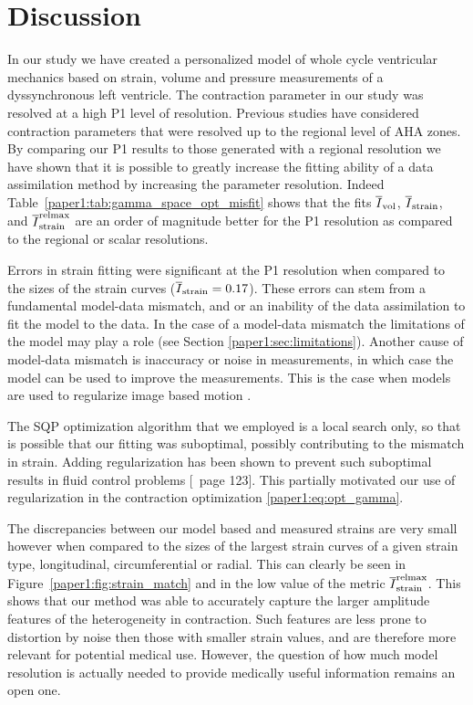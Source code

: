 \section{Discussion}
\label{paper1:sec:discussion}
In our study we have created a personalized model of whole cycle ventricular mechanics
based on strain, volume and pressure measurements of a dyssynchronous left ventricle. 
The contraction parameter in our study was resolved at a high P1 level of resolution.
Previous studies \cite{wong2015velocity, chabiniok2012estimation} have considered
contraction parameters that were resolved up to the regional level of AHA zones. By comparing
our P1 results to those generated with a regional resolution we have shown that it is possible
to greatly increase the fitting ability of a data assimilation method by increasing the 
parameter resolution. Indeed Table~\ref{paper1:tab:gamma_space_opt_misfit} shows 
that the fits $\overline{I}_{\text{vol}}$, $\overline{I}_{\text{strain}}$, and  $\overline{I}^{\text{relmax}}_{\text{strain}}$ are an order of magnitude better for
the P1 resolution as compared to the regional or scalar resolutions. 

Errors in strain fitting were significant at the P1 resolution when compared 
to the sizes of the strain curves ($\overline{I}_{\text{strain}} = 0.17$). These errors can 
stem from a fundamental model-data 
mismatch, and or an inability of the data assimilation to fit the model to the data. 
In the case of a model-data mismatch the limitations of the model may play a role (see Section \ref{paper1:sec:limitations}).
Another cause of model-data mismatch
is inaccuracy or noise in measurements, in which case the model can be used to improve 
the measurements. This is the case when models are used to regularize image based motion
\cite{papademetris2002estimation, tuyisenge2016estimation}. 

The SQP optimization algorithm that we employed is a local search only, so that is possible that
our fitting was suboptimal, possibly contributing to the mismatch in strain. Adding regularization
has been shown to prevent such suboptimal results in fluid control problems [\cite{gunzburger2003perspectives}~page 123].
This partially motivated our use of regularization in the contraction optimization \eqref{paper1:eq:opt_gamma}.

The discrepancies between our model based and measured strains are very small however when compared to
the sizes of the largest strain curves of a given strain type, longitudinal, 
circumferential or radial. This can clearly be seen in Figure~\ref{paper1:fig:strain_match}
and in the low value of the metric $\overline{I}^{\text{relmax}}_{\text{strain}}$. This shows that our method was able
to accurately capture the larger amplitude features of the heterogeneity in contraction. 
Such features are less prone to distortion by noise then those with smaller strain values, and are
therefore more relevant for potential medical use. However, the question of how much 
model resolution is actually needed to provide medically useful information 
remains an open one.

